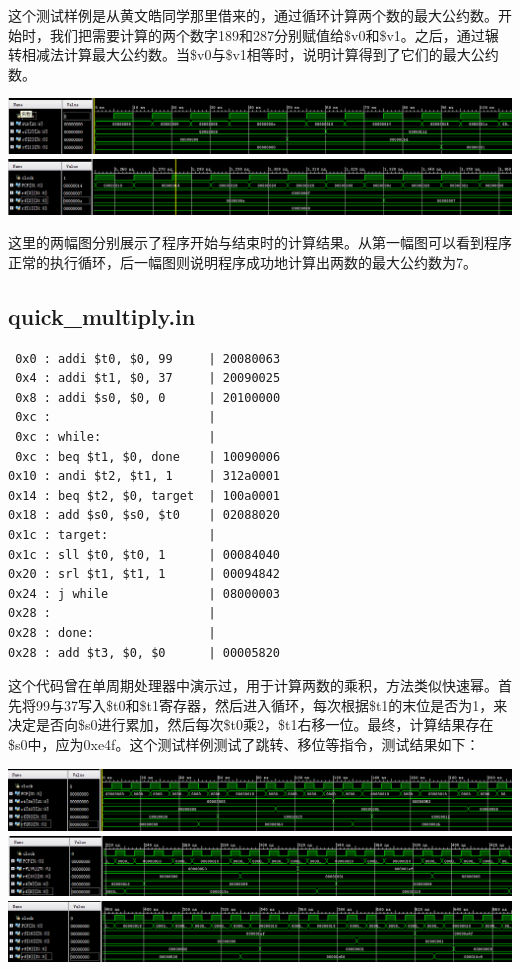 \documentclass[12pt]{article} %
\begin{document}
\begin{sloppypar}
\begin{lstlisting}
\end{lstlisting}

这个测试样例是从黄文皓同学那里借来的，通过循环计算两个数的最大公约数。开始时，我们把需要计算的两个数字189和287分别赋值给\$v0和\$v1。之后，通过辗转相减法计算最大公约数。当\$v0与\$v1相等时，说明计算得到了它们的最大公约数。

\noindent
\includegraphics[width =\linewidth]{figure/gcd1.png}
\includegraphics[width =\linewidth]{figure/gcd2.png}

这里的两幅图分别展示了程序开始与结束时的计算结果。从第一幅图可以看到程序正常的执行循环，后一幅图则说明程序成功地计算出两数的最大公约数为7。


\subsection{quick\_multiply.in}

\begin{lstlisting}
 0x0 : addi $t0, $0, 99     | 20080063
 0x4 : addi $t1, $0, 37     | 20090025
 0x8 : addi $s0, $0, 0      | 20100000
 0xc :                      | 
 0xc : while:               | 
 0xc : beq $t1, $0, done    | 10090006
0x10 : andi $t2, $t1, 1     | 312a0001
0x14 : beq $t2, $0, target  | 100a0001
0x18 : add $s0, $s0, $t0    | 02088020
0x1c : target:              | 
0x1c : sll $t0, $t0, 1      | 00084040
0x20 : srl $t1, $t1, 1      | 00094842
0x24 : j while              | 08000003
0x28 :                      | 
0x28 : done:                | 
0x28 : add $t3, $0, $0      | 00005820
\end{lstlisting} 

这个代码曾在单周期处理器中演示过，用于计算两数的乘积，方法类似快速幂。首先将99与37写入\$t0和\$t1寄存器，然后进入循环，每次根据\$t1的末位是否为1，来决定是否向\$s0进行累加，然后每次\$t0乘2，\$t1右移一位。最终，计算结果存在\$s0中，应为0xe4f。这个测试样例测试了跳转、移位等指令，测试结果如下：

\noindent
\includegraphics[width =\linewidth]{figure/mul1.png}
\includegraphics[width =\linewidth]{figure/mul2.png}
\includegraphics[width =\linewidth]{figure/mul3.png}


\end{sloppypar}
\end{document}
